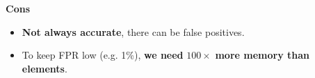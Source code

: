 \highspace
\begin{flushleft}
    \textcolor{Red2}{ \textbf{Cons}}
\end{flushleft}
\begin{itemize}[label=\textcolor{Red2}{}]
    \item \textbf{Not always accurate}, there can be false positives.
    \item To keep FPR low (e.g. 1\%), \textbf{we need} $100\times$ \textbf{more memory than elements}.
\end{itemize}